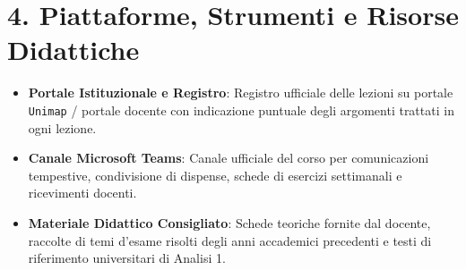 \documentclass[11pt,a4paper,twoside,openright]{book}
\begin{document}
\section*{4. Piattaforme, Strumenti e Risorse Didattiche}
\begin{itemize}
    \item \textbf{Portale Istituzionale e Registro}: Registro ufficiale delle lezioni su portale \texttt{Unimap} / portale docente con indicazione puntuale degli argomenti trattati in ogni lezione.
    \item \textbf{Canale Microsoft Teams}: Canale ufficiale del corso per comunicazioni tempestive, condivisione di dispense, schede di esercizi settimanali e ricevimenti docenti.
    \item \textbf{Materiale Didattico Consigliato}: Schede teoriche fornite dal docente, raccolte di temi d'esame risolti degli anni accademici precedenti e testi di riferimento universitari di Analisi 1.
\end{itemize}

\cleardoublepage

\mainmatter










\end{document}
